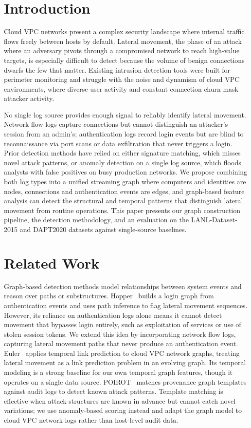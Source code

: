 \documentclass[letterpaper,twocolumn,10pt]{article}
\begin{document}
\section{Introduction}

Cloud VPC networks present a complex security landscape where internal traffic flows freely between hosts by default. Lateral movement, the phase of an attack where an adversary pivots through a compromised network to reach high-value targets, is especially difficult to detect because the volume of benign connections dwarfs the few that matter. Existing intrusion detection tools were built for perimeter monitoring and struggle with the noise and dynamism of cloud VPC environments, where diverse user activity and constant connection churn mask attacker activity.

No single log source provides enough signal to reliably identify lateral movement. Network flow logs capture connections but cannot distinguish an attacker's session from an admin's; authentication logs record login events but are blind to reconnaissance via port scans or data exfiltration that never triggers a login. Prior detection methods have relied on either signature matching, which misses novel attack patterns, or anomaly detection on a single log source, which floods analysts with false positives on busy production networks. We propose combining both log types into a unified streaming graph where computers and identities are nodes, connections and authentication events are edges, and graph-based feature analysis can detect the structural and temporal patterns that distinguish lateral movement from routine operations. This paper presents our graph construction pipeline, the detection methodology, and an evaluation on the LANL-Dataset-2015 and DAPT2020 datasets against single-source baselines.

\section{Related Work}

Graph-based detection methods model relationships between system events and reason over paths or substructures. Hopper~\cite{hopper2021} builds a login graph from authentication events and uses path inference to flag lateral movement sequences. However, its reliance on authentication logs alone means it cannot detect movement that bypasses login entirely, such as exploitation of services or use of stolen session tokens. We extend this idea by incorporating network flow logs, capturing lateral movement paths that never produce an authentication event. Euler~\cite{euler2023} applies temporal link prediction to cloud VPC network graphs, treating lateral movement as a link prediction problem in an evolving graph. Its temporal modeling is a strong baseline for our own temporal graph features, though it operates on a single data source. POIROT~\cite{poirot2019} matches provenance graph templates against audit logs to detect known attack patterns. Template matching is effective when attack structures are known in advance but cannot catch novel variations; we use anomaly-based scoring instead and adapt the graph model to cloud VPC network logs rather than host-level audit data.
\end{document}
